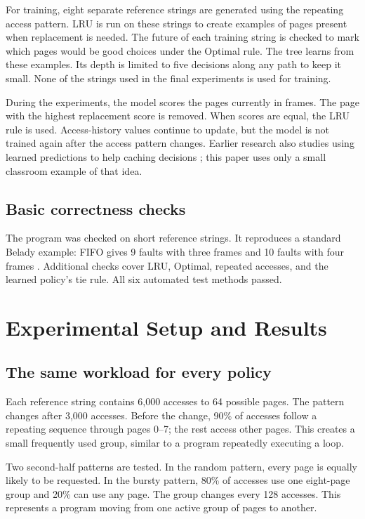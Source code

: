 \documentclass[11pt,a4paper]{article}
\begin{document}
For training, eight separate reference strings are generated using the repeating
access pattern. LRU is run on these strings to create examples of pages present
when replacement is needed. The future of each training string is checked to mark
which pages would be good choices under the Optimal rule. The tree learns from
these examples. Its depth is limited to five decisions along any path to keep it
small. None of the strings used in the final experiments is used for training.

During the experiments, the model scores the pages currently in frames. The page
with the highest replacement score is removed. When scores are equal, the LRU
rule is used. Access-history values continue to update, but the model is not
trained again after the access pattern changes. Earlier research also studies
using learned predictions to help caching decisions \cite{lykouris}; this paper
uses only a small classroom example of that idea.

\subsection{Basic correctness checks}
The program was checked on short reference strings. It reproduces a standard
Belady example: FIFO gives 9 faults with three frames and 10 faults with four
frames \cite{cornell}. Additional checks cover LRU, Optimal, repeated accesses,
and the learned policy's tie rule. All six automated test methods passed.

\newpage
\section{Experimental Setup and Results}
\subsection{The same workload for every policy}
Each reference string contains 6,000 accesses to 64 possible pages. The pattern
changes after 3,000 accesses. Before the change, 90\% of accesses follow a repeating
sequence through pages 0--7; the rest access other pages. This creates a small
frequently used group, similar to a program repeatedly executing a loop.

Two second-half patterns are tested. In the random pattern, every page is equally
likely to be requested. In the bursty pattern, 80\% of accesses use one eight-page
group and 20\% can use any page. The group changes every 128 accesses. This represents a program moving
from one active group of pages to another.
\end{document}
